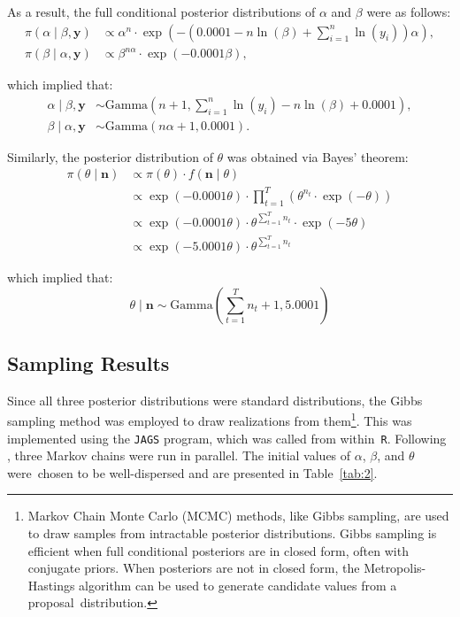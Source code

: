 \documentclass{Class/julia}
\begin{document}
\noindent As a result, the full conditional posterior distributions of \( \alpha \) and \( \beta \) were as follows:
\begin{align*}
\pi(\alpha \mid \beta, \mathbf{y}) &\propto \alpha^n \cdot \exp\left( - \left( 0.0001 - n \ln(\beta) + \sum_{i=1}^{n} \ln(y_i) \right) \alpha \right), \\
\pi(\beta \mid \alpha, \mathbf{y}) &\propto \beta^{n \alpha} \cdot \exp(-0.0001 \beta),
\end{align*}

\noindent which implied that:
\begin{align*}
\alpha \mid \beta, \mathbf{y} &\sim \text{Gamma}\left(n+1, \sum_{i=1}^{n} \ln(y_i) - n \ln(\beta) + 0.0001\right), \\
\beta \mid \alpha, \mathbf{y} &\sim \text{Gamma}(n \alpha + 1, 0.0001).
\end{align*}

Similarly, the posterior distribution of \( \theta \) was obtained via Bayes' theorem:
\begin{align*}
\pi(\theta \mid \mathbf{n}) &\propto \pi(\theta) \cdot f(\mathbf{n} \mid \theta) \\
&\propto \exp(-0.0001 \theta) \cdot \prod_{t=1}^{T} \left( \theta^{n_t} \cdot \exp(-\theta) \right) \\
&\propto \exp(-0.0001 \theta) \cdot \theta^{\sum_{t=1}^{T} n_t} \cdot \exp(-5 \theta) \\
&\propto \exp(-5.0001 \theta) \cdot \theta^{\sum_{t=1}^{T} n_t}
\end{align*}

\noindent which implied that:
\[
\theta \mid \mathbf{n} \sim \text{Gamma}\left( \sum_{t=1}^{T} n_t + 1, 5.0001 \right)
\]

\subsection{Sampling Results}

Since all three posterior distributions were standard distributions, the Gibbs sampling method was employed to draw realizations from them\footnote{Markov Chain Monte Carlo (MCMC) methods, like Gibbs sampling, are used to draw samples from intractable posterior distributions. Gibbs sampling is efficient when full conditional posteriors are in closed form, often with conjugate priors. When posteriors are not in closed form, the Metropolis-Hastings algorithm can be used to generate candidate values from a proposal~distribution.}. This was implemented using the \texttt{JAGS} program, which was called from within~\texttt{R}. Following \citet{dudley2006bayesian}, three Markov chains were run in parallel. The initial values of \( \alpha \), \( \beta \), and \( \theta \) were~chosen to be well-dispersed and are presented in Table~\ref{tab:2}.
\end{document}

